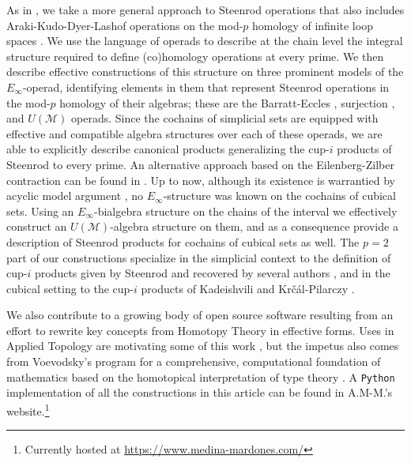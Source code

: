 As in \cite{may70generalapproach}, we take a more general approach to Steenrod operations that also includes Araki-Kudo-Dyer-Lashof operations on the mod-$p$ homology of infinite loop spaces \cites{araki56squaring, dyer62lashof}. We use the language of operads \cite{may72geometry}  to describe at the chain level the integral structure required to define (co)homology operations at every prime. We then describe effective constructions of this structure on three prominent models of the $E_\infty$-operad, identifying elements in them that represent Steenrod operations in the mod-$p$ homology of their algebras; these are the Barratt-Eccles \cite{berger04combinatorial}, surjection \cite{mcclure03cochain}, and $U(\mathcal M)$ \cite{medina2020prop1} operads. Since the cochains of simplicial sets are equipped with effective and compatible algebra structures over each of these operads, we are able to explicitly describe canonical products generalizing the \mbox{cup-$i$} products of Steenrod to every prime. An alternative approach based on the Eilenberg-Zilber contraction can be found in \cite{gonzalez2005hpt}. Up to now, although its existence is warrantied by acyclic model argument \cite{eilenberg1953acyclic}, no $E_\infty$-structure was known on the cochains of cubical sets. Using an $E_\infty$-bialgebra structure on the chains of the interval we effectively construct an $U(\mathcal M)$-algebra structure on them, and as a consequence provide a description of Steenrod products for cochains of cubical sets as well. The $p=2$ part of our constructions specialize in the simplicial context to the definition of cup-$i$ products given by Steenrod \cite{steenrod47products} and recovered by several authors \cites{mcclure03cochain, berger04combinatorial, medina2018axiomatic}, and in the cubical setting to the cup-$i$ products of  Kadeishvili \cite{kadeishvili1998dg} and Kr\v{c}\'{a}l-Pilarczy \cite{pilarczyk2016cubical}.

We also contribute to a growing body of open source software \cites{manero2020effective, pilarczyk2015contraction, sagemath} resulting from an effort to rewrite key concepts from Homotopy Theory in effective forms. Uses in Applied Topology are motivating some of this work \cite{tauzin2020giottotda}, but the impetus also comes from Voevodsky's program for a comprehensive, computational foundation of mathematics based on the homotopical interpretation of type theory \cite{bauer2017hott}. A \texttt{Python} implementation of all the constructions in this article can be found in A.M-M.'s website.\footnote{Currently hosted at \url{https://www.medina-mardones.com/}}

